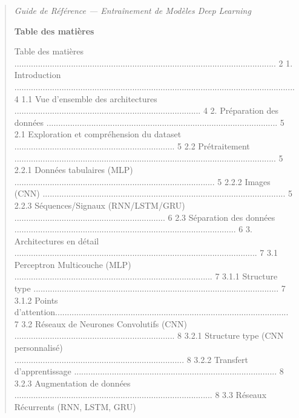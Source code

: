 \documentclass[
]{article}
\begin{document}
\begin{quote}
\emph{Guide de Référence --- Entraînement de Modèles Deep Learning}

\textbf{Table des matières}

Table des matières
...............................................................................................................
2 1. Introduction
.......................................................................................................................
4 1.1 Vue d'ensemble des architectures
...............................................................................
4 2. Préparation des données
..................................................................................................
5 2.1 Exploration et compréhension du dataset
.................................................................... 5
2.2 Prétraitement\\
...............................................................................................................
5 2.2.1 Données tabulaires (MLP)
.....................................................................................
5 2.2.2 Images (CNN)
.......................................................................................................
5 2.2.3 Séquences/Signaux (RNN/LSTM/GRU)
................................................................ 6 2.3
Séparation des données
..............................................................................................
6 3. Architectures en détail\\
.......................................................................................................
7 3.1 Perceptron Multicouche (MLP)
....................................................................................
7 3.1.1 Structure type
........................................................................................................
7 3.1.2 Points
d'attention...................................................................................................
7 3.2 Réseaux de Neurones Convolutifs (CNN)
.................................................................... 8
3.2.1 Structure type (CNN personnalisé)\\
........................................................................
8 3.2.2 Transfert d'apprentissage
......................................................................................
8 3.2.3 Augmentation de données
....................................................................................
8 3.3 Réseaux Récurrents (RNN, LSTM, GRU)

\end{quote}
\end{document}
